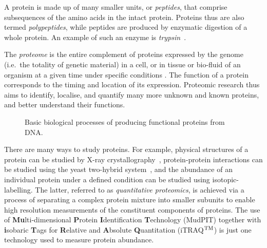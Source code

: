 A protein is made up of many smaller units, or \emph{peptides}, that comprise subsequences of the amino acids in the intact protein. Proteins thus are also termed \emph{polypeptides}, while peptides are produced by enzymatic digestion of a whole protein. An example of such an enzyme is \emph{trypsin}~\citep{Eidhammer2008}. 

The \emph{proteome} is the entire complement of proteins expressed by the genome (i.e.\ the totality of genetic material) in a cell, or in tissue or bio-fluid of an organism at a given time under specific conditions \citep{Boehm2007}. The function of a protein corresponds to the timing and location of its expression. Proteomic research thus aims to identify, localise, and quantify many more unknown and known proteins, and better understand their functions. 

\begin{figure}[hbt]
\caption{Basic biological processes of producing functional proteins from DNA.}
\label{fig:processes}
\end{figure}

There are many ways to study proteins. For example, physical structures of a protein can be studied by X-ray crystallography~\citep{Blow2002}, protein-protein interactions can be studied using the yeast two-hybrid system~\citep{Fields1989}, and the abundance of an individual protein under a defined condition can be studied using isotopic-labelling. The latter, referred to as \emph{quantitative proteomics}, is achieved via a process of separating a complex protein mixture into smaller subunits to enable high resolution measurements of the constituent components of proteins. The use of  {\bf Mu}lti-dimensional {\bf P}rotein {\bf I}dentification {\bf T}echnology (MudPIT) together with {\bf i}sobaric {\bf T}ags for {\bf R}elative and {\bf A}bsolute {\bf Q}uantitation (iTRAQ$^{\rm TM}$) is just one technology used to measure protein abundance.  


